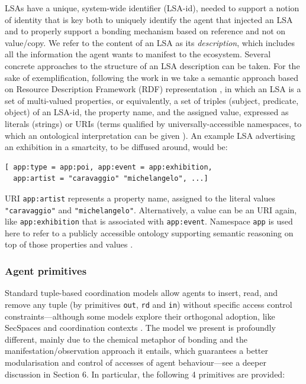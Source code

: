 \documentclass[12pt,a4paper,twoside,openright]{book}
\begin{document}
LSAs have a unique, system-wide identifier (LSA-id), needed to support a notion of identity that is key both to uniquely identify the agent that injected an LSA and to properly support a bonding mechanism based on reference and not on value/copy. We refer to the content of an LSA as its \emph{description}, which includes all the information the agent wants to manifest to the ecosystem.
%
Several concrete approaches to the structure of an LSA description can be taken.
%
For the sake of exemplification, following the work in \cite{SemanticSapereIGI2012,sapereecolaws-sac2012,SemMatchingSAC2013} we  take a semantic approach based on Resource Description Framework (RDF) representation \cite{manola2004primer}, in which an LSA is a set of multi-valued properties, or equivalently, a set of triples (subject, predicate, object) of an LSA-id, the property name, and the assigned value, expressed as literals (strings) or URIs (terms qualified by universally-accessible namespaces, to which an ontological interpretation can be given \cite{ranganathan2004ontologies}).
%
An example LSA advertising an exhibition in a smartcity, to be diffused around, would be: 

{\begin{Verbatim}[samepage=true,frame=single,commandchars=\\\{\}]
[ app:type = app:poi, app:event = app:exhibition,
  app:artist = "caravaggio" "michelangelo", ...]
\end{Verbatim}
}

\noindent URI \texttt{app:artist} represents a property name, assigned to the literal values \mbox{\texttt{"caravaggio"}} and \mbox{\texttt{"michelangelo"}}. Alternatively, a value can be an URI again, like \texttt{app:exhibition} that is associated with \texttt{app:event}. Namespace \texttt{app} is used here to refer to a publicly accessible ontology supporting semantic reasoning on top of those properties and values \cite{SemMatchingSAC2013}.

\subsubsection{Agent primitives}\label{s:agent}

Standard tuple-based coordination models allow agents to insert, read, and remove any tuple (by primitives \texttt{out}, \texttt{rd} and \texttt{in}) without specific access control constraints---although some models explore their orthogonal adoption, like SecSpaces \cite{GorrieriLZ06} and coordination contexts \cite{J-ORV-AAECC2005,RVO-ATAI2004}.
%
The model we present is profoundly different, mainly due to the chemical metaphor of bonding and the manifestation/observation approach it entails, which guarantees a better modularisation and control of accesses of agent behaviour---see a deeper discussion in Section 6.
%
In particular, the following 4 primitives are provided:
\end{document}
